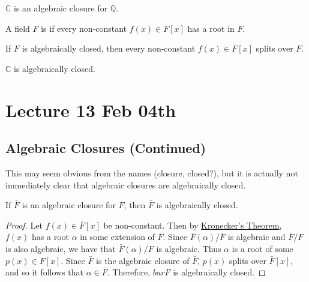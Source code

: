 \documentclass[notoc,notitlepage]{tufte-book}
\begin{document}
\begin{eg}
  $\mathbb{C}$ is  an algebraic closure for $\mathbb{Q}$.
\end{eg}

\begin{defn}\label{defn:algebraically_closed}
  A field $F$ is  if every non-constant $f(x) \in F[x]$
  has a root in $F$.
\end{defn}

\begin{remark}
  If $F$ is algebraically closed, then every non-constant $f(x) \in F[x]$ splits over $F$.
\end{remark}

\begin{eg}
  $\mathbb{C}$ is algebraically closed.
\end{eg}



\chapter{Lecture 13 Feb 04th}%
\label{chp:lecture_13_feb_04th}

\section{Algebraic Closures (Continued)}%
\label{sec:algebraic_closures_continued}

This may seem obvious from the names (closure, closed?), but it is actually not
immediately clear that algebraic closures are algebraically closed.

\begin{propo}\label{propo:algebraic_closures_are_algebraically_closed}
  If $\bar{F}$ is an algebraic closure for $F$, then $\bar{F}$ is algebraically closed.
\end{propo}

\begin{proof}
  Let $f(x) \in \bar{F}[x]$ be non-constant. Then by
  \hyperref[thm:kronecker_s_theorem]{Kronecker's Theorem}, $f(x)$ has a root $\alpha$ in
  some extension of $\bar{F}$. Since $\bar{F}(\alpha) / \bar{F}$ is algebraic and $\bar{F}
  / F$ is also algebraic, we have that $\bar{F}(\alpha) / F$ is algebraic. Thus $\alpha$
  is a root of some $p(x) \in F[x]$. Since $\bar{F}$ is the algebraic closure of
  $\bar{F}$, $p(x)$ splits over $\bar{F}[x]$, and so it follows that $\alpha \in \bar{F}$.
  Therefore, $bar{F}$ is algebraically closed.
\end{proof}
\end{document}
